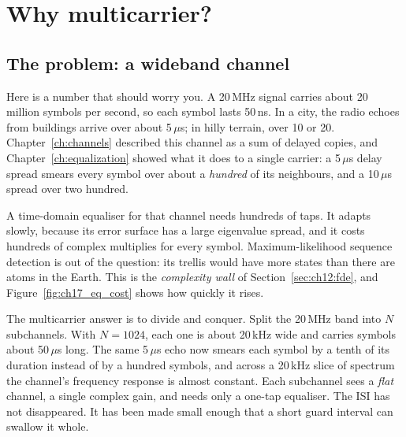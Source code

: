 \section{Why multicarrier?}
\label{sec:ch17:why}

\subsection{The problem: a wideband channel}

Here is a number that should worry you. A 20\,MHz signal carries about 20 million symbols per
second, so each symbol lasts 50\,ns. In a city, the radio echoes from buildings arrive over about
5\,$\mu$s; in hilly terrain, over 10 or 20. Chapter~\ref{ch:channels} described this channel as a
sum of delayed copies, and Chapter~\ref{ch:equalization} showed what it does to a single carrier:
a 5\,$\mu$s delay spread smears every symbol over about a \emph{hundred} of its neighbours, and a
10\,$\mu$s spread over two hundred.

A time-domain equaliser for that channel needs hundreds of taps. It adapts slowly, because its
error surface has a large eigenvalue spread, and it costs hundreds of complex multiplies for every
symbol. Maximum-likelihood sequence detection is out of the question: its trellis would have more
states than there are atoms in the Earth. This is the \emph{complexity wall} of
Section~\ref{sec:ch12:fde}, and Figure~\ref{fig:ch17_eq_cost} shows how quickly it rises.


The multicarrier answer is to divide and conquer. Split the 20\,MHz band into $N$ subchannels.
With $N=1024$, each one is about 20\,kHz wide and carries symbols about 50\,$\mu$s long. The same
5\,$\mu$s echo now smears each symbol by a tenth of its duration instead of by a hundred symbols,
and across a 20\,kHz slice of spectrum the channel's frequency response is almost constant. Each
subchannel sees a \emph{flat} channel, a single complex gain, and needs only a one-tap equaliser.
The ISI has not disappeared. It has been made small enough that a short guard interval can swallow
it whole.

